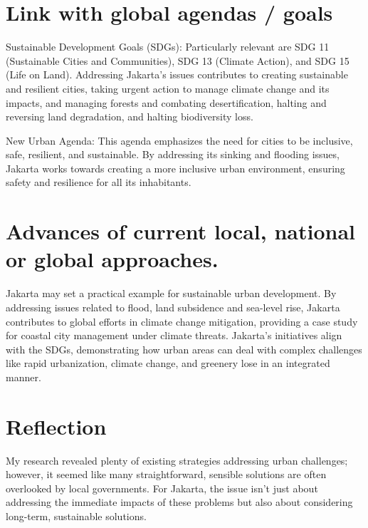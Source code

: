 \documentclass[
  letterpaper,
  DIV=11,
  numbers=noendperiod]{scrreprt}
\begin{document}

\chapter{Link with global agendas /
goals}\label{link-with-global-agendas-goals}

Sustainable Development Goals (SDGs): Particularly relevant are SDG 11
(Sustainable Cities and Communities), SDG 13 (Climate Action), and SDG
15 (Life on Land). Addressing Jakarta's issues contributes to creating
sustainable and resilient cities, taking urgent action to manage climate
change and its impacts, and managing forests and combating
desertification, halting and reversing land degradation, and halting
biodiversity loss.

New Urban Agenda: This agenda emphasizes the need for cities to be
inclusive, safe, resilient, and sustainable. By addressing its sinking
and flooding issues, Jakarta works towards creating a more inclusive
urban environment, ensuring safety and resilience for all its
inhabitants.


\chapter{Advances of current local, national or global
approaches.}\label{advances-of-current-local-national-or-global-approaches.}

Jakarta may set a practical example for sustainable urban development.
By addressing issues related to flood, land subsidence and sea-level
rise, Jakarta contributes to global efforts in climate change
mitigation, providing a case study for coastal city management under
climate threats. Jakarta's initiatives align with the SDGs,
demonstrating how urban areas can deal with complex challenges like
rapid urbanization, climate change, and greenery lose in an integrated
manner.


\chapter{Reflection}\label{reflection-2}

My research revealed plenty of existing strategies addressing urban
challenges; however, it seemed like many straightforward, sensible
solutions are often overlooked by local governments. For Jakarta, the
issue isn't just about addressing the immediate impacts of these
problems but also about considering long-term, sustainable solutions.
\end{document}

